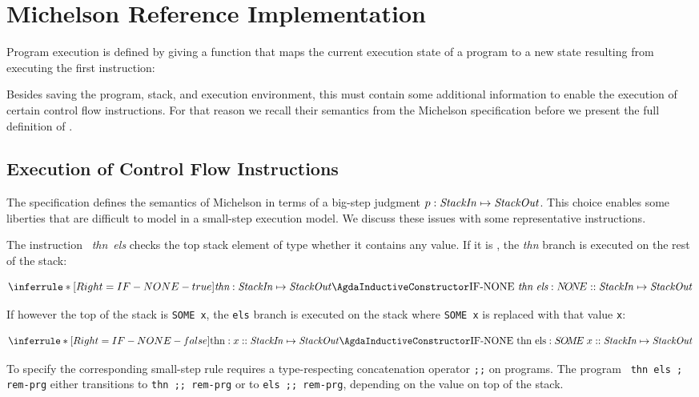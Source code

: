 \section{Michelson Reference Implementation}
\label{sec:refImpl}

Program execution is defined by giving a function that maps
the current execution state of a program to a new state resulting from executing
the first instruction:
\ConcreteprogStep

Besides saving the program, stack, and execution environment, this  must contain
some additional information to enable the execution of certain control flow instructions.
For that reason we recall their semantics from the Michelson specification
before we present the full definition of .

\subsection{Execution of Control Flow
  Instructions}\label{sec:control-flow}

The specification defines the semantics of Michelson in terms of a big-step
judgment $p : \text{\emph{StackIn}} \mapsto
\text{\emph{StackOut}}$. This choice enables some liberties that are
difficult to model in a small-step execution
model. We discuss these issues with some representative instructions.

The instruction ~\textit{thn}~\textit{els} checks the top stack element of type 
whether it contains any value.
If it is , the \textit{thn} branch is executed on the
rest of the stack:

\[	\inferrule*	[Right=IF-NONE-true]
 	{\textit{thn} : \text{\emph{StackIn}} \mapsto \text{\emph{StackOut}}}
 	{\text{\ACon{IF-NONE} }\textit{thn}~\textit{els} : N\!O\!N\!E :: \text{\emph{StackIn}} 
		\mapsto \text{\emph{StackOut}}}
\]

If however the top of the stack is \verb/SOME x/,
the \verb/els/ branch is executed on the stack where \verb/SOME x/
is replaced with that value \verb/x/:

\[	\inferrule*	[Right=IF-NONE-false]
	{\text{thn} : x :: \text{\emph{StackIn}} \mapsto \text{\emph{StackOut}}}
	{\text{\ACon{IF-NONE} thn els} : S\!\!\;O\!M\!E\; x :: \text{\emph{StackIn}} 
		\mapsto \text{\emph{StackOut}}}
\]

To specify the corresponding small-step rule requires a type-respecting concatenation
operator \verb/;;/ on programs. 
The program \verb/ thn els ; rem-prg/ either transitions to
\verb/thn ;; rem-prg/ or to \verb/els ;; rem-prg/,
depending on the value on top of the stack.

